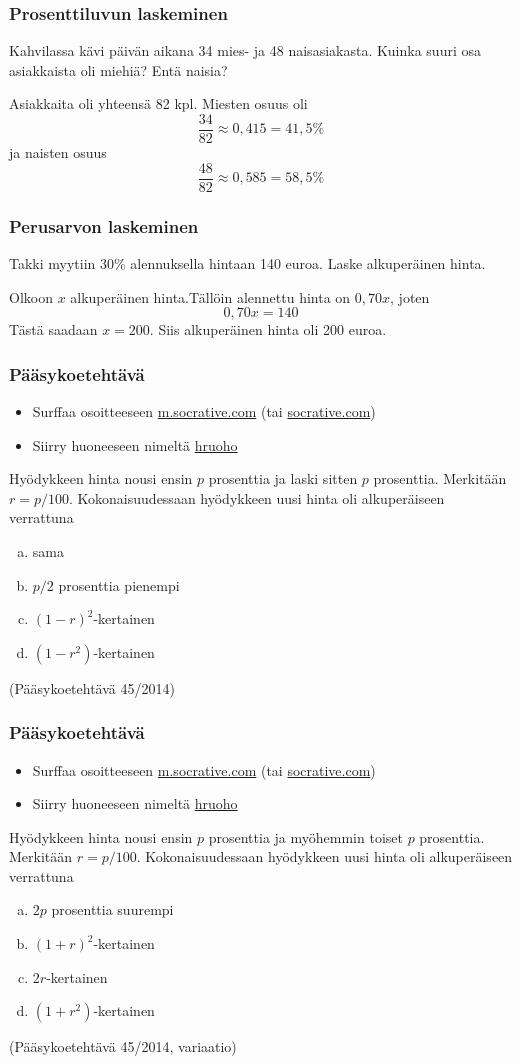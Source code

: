 \documentclass[]{beamer}\usepackage[]{graphicx}\usepackage[]{color}
\newcommand{\socrativeOhje}{
\begin{itemize}
\item Surffaa osoitteeseen \url{m.socrative.com} (tai \url{socrative.com})
\item Siirry huoneeseen nimeltä \url{hruoho}
\end{itemize}
}
\begin{document}
\begin{frame}
\frametitle{Prosenttiluvun laskeminen}
	\pause 
	\begin{esim}
		Kahvilassa kävi päivän aikana 34 mies- ja 48 naisasiakasta. Kuinka suuri osa asiakkaista oli miehiä? Entä naisia?
	\end{esim}
	\pause
	\begin{ratkaisu}
		Asiakkaita oli yhteensä 82 kpl. \pause Miesten osuus oli
		\[
			\frac{34}{82} \approx 0,415 = 41,5\%
		\]
		\pause
		ja naisten osuus
		\[
			\frac{48}{82} \approx 0,585 = 58,5 \%
		\]		
	\end{ratkaisu}
\end{frame}

\begin{frame}
\frametitle{Perusarvon laskeminen}
	\begin{esim}
		Takki myytiin 30\% alennuksella hintaan 140 euroa. Laske alkuperäinen hinta.
	\end{esim}
	\begin{ratkaisu}
		Olkoon \(x\) alkuperäinen hinta.\pause Tällöin alennettu hinta on \(0,70x\)\pause , joten
		\[
			0,70x = 140
		\]
		\pause Tästä saadaan \(x=200\). \pause Siis alkuperäinen hinta oli 200 euroa.
	\end{ratkaisu}
\end{frame}

\begin{frame}
  \frametitle{Pääsykoetehtävä}
  \socrativeOhje
  \begin{esim}
Hyödykkeen hinta nousi ensin \(p\) prosenttia ja laski sitten \(p\) prosenttia. Merkitään \(r=p/100\). Kokonaisuudessaan hyödykkeen uusi hinta oli alkuperäiseen verrattuna
    \begin{enumerate}[(a)]
      \item sama
      \item \(p/2\) prosenttia pienempi
      \item \((1-r)^2\)-kertainen
      \item \((1-r^2)\)-kertainen
    \end{enumerate}
    (Pääsykoetehtävä 45/2014)
  \end{esim}
\end{frame}

\begin{frame}
  \frametitle{Pääsykoetehtävä}
  \socrativeOhje
  \begin{esim}
Hyödykkeen hinta nousi ensin \(p\) prosenttia ja myöhemmin toiset \(p\) prosenttia. Merkitään \(r=p/100\). Kokonaisuudessaan hyödykkeen uusi hinta oli alkuperäiseen verrattuna
    \begin{enumerate}[(a)]
      \item \(2p\) prosenttia suurempi
      \item \((1+r)^2\)-kertainen
      \item \(2r\)-kertainen
      \item \((1+r^2)\)-kertainen
    \end{enumerate}
    (Pääsykoetehtävä 45/2014, variaatio)
  \end{esim}
\end{frame}
\end{document}
